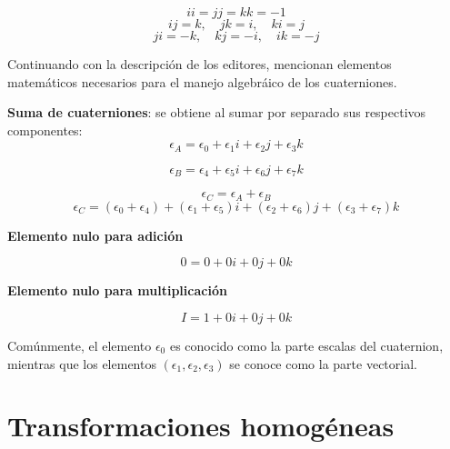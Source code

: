\begin{equation*}
    ii=jj=kk=-1
\end{equation*}
\begin{equation*}
    ij=k,\quad jk=i, \quad ki=j
\end{equation*}
\begin{equation*}
    ji=-k, \quad kj = -i, \quad ik = -j
\end{equation*}

Continuando con la descripción de los editores, mencionan elementos matemáticos necesarios para el manejo algebráico de los cuaterniones.

\textbf{Suma de cuaterniones}: se obtiene al sumar por separado sus respectivos componentes:\\
\begin{equation*}
    \epsilon_{A} = \epsilon_{0}+\epsilon_{1}i+
    \epsilon_{2}j+
    \epsilon_{3}k
\end{equation*}

\begin{equation*}
    \epsilon_{B} = \epsilon_{4}+\epsilon_{5}i+
    \epsilon_{6}j+
    \epsilon_{7}k
\end{equation*}

\begin{equation*}
    \epsilon_{C} = \epsilon_{A} + \epsilon_{B}
\end{equation*}
\begin{equation*}
\epsilon_{C} =                     (\epsilon_{0}+
    \epsilon_{4})+(\epsilon_{1}+\epsilon_{5})i+
    (\epsilon_{2}+\epsilon_{6})j+
    (\epsilon_{3}+\epsilon_{7})k
\end{equation*}

\textbf{Elemento nulo para adición}

\begin{equation*}
    0 = 0 + 0i + 0j + 0k
\end{equation*}

\textbf{Elemento nulo para multiplicación}

\begin{equation*}
    I = 1 + 0i + 0j + 0k
\end{equation*}

Comúnmente, el elemento $\epsilon_{0}$ es conocido como la parte escalas del cuaternion, mientras que los elementos $(\epsilon_{1},\epsilon_{2}, \epsilon_{3})$ se conoce como la parte vectorial.

\section{Transformaciones homogéneas}

